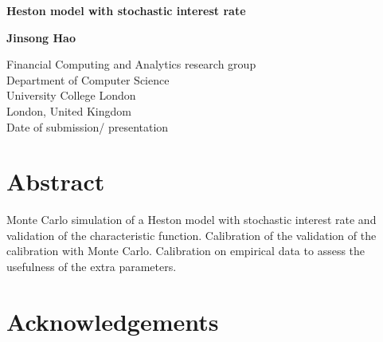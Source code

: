 \documentclass[12pt]{report}
\begin{document}
\begin{titlepage}
\begin{center}
        \vspace*{0.1cm}
        \LARGE %
        \textbf{Heston model with stochastic interest rate}
        \large
        \vfill
        \begin{center}
        \textbf{Jinsong Hao
        } %
        \end{center}
        \vfill
        \begin{flushleft}
        
        \vspace{0.8cm}
        Financial Computing and Analytics research group\\
        Department of Computer Science\\
        University College London\\
        London, United Kingdom\\ %
        Date of submission/ presentation
        \end{flushleft}
\end{center}
\end{titlepage}


\thispagestyle{empty}
\chapter*{Abstract}

Monte Carlo simulation of a Heston model with stochastic interest rate and validation of the characteristic function. Calibration of the validation of the calibration with Monte Carlo. Calibration on empirical data to assess the usefulness of the extra parameters.


\thispagestyle{empty}
\chapter*{Acknowledgements}
\end{document}
